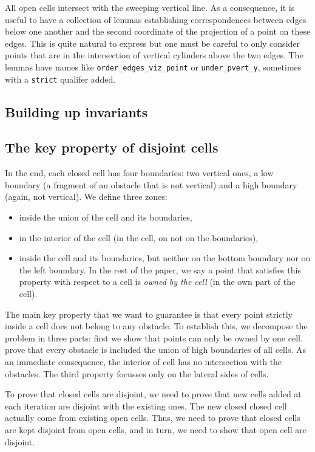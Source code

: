\documentclass[a4paper, USenglish, cleveref, autoref, thm-restate]{lipics-v2021}
\begin{document}
All open cells intersect with the sweeping vertical line.  As a
consequence, it is useful to have a collection of lemmas establishing
correspondences between edges below one another and the second coordinate
of the projection of a point on these edges.  This is quite natural to
express but one must be careful to only consider points that are in
the intersection of vertical cylinders above the two edges.  The lemmas
have names like {\tt order\_edges\_viz\_point} or {\tt under\_pvert\_y},
sometimes with a {\tt strict} qualifer added.

\subsection{Building up invariants}
\subsection{The key property of disjoint cells}
In the end, each closed cell has four boundaries: two vertical ones, a
low boundary (a fragment of an obstacle that is not vertical) and a
high boundary (again, not vertical).  We define three zones:
\begin{itemize}
\item inside the union of the cell and its boundaries,
\item in the interior of the cell (in the cell, on not on the boundaries),
\item inside the cell and its
 boundaries, but neither on the bottom boundary nor on the left
 boundary.  In the rest of the paper, we say a point that satisfies
 this property with respect to a cell is {\em owned by the cell} (in the
 own part of the cell).
\end{itemize}
The main key property that we want to guarantee is that every point
strictly inside a cell does not belong to any obstacle.  To establish
this, we decompose the problem in three parts: first we show
that points can only be owned by one cell.
prove that every obstacle is included the union of high boundaries of
all cells.  As an immediate consequence, the interior of cell has no
intersection with the obstacles.  The third property focusses only on the
lateral sides of cells.

To prove that closed cells are disjoint, we need to prove that new
cells added at each iteration are disjoint with the existing ones.
The new closed closed cell actually come from
existing open cells.  Thus, we need to prove that
closed cells are kept disjoint from open cells, and in turn, we need to
show that open cell are disjoint.
\end{document}
